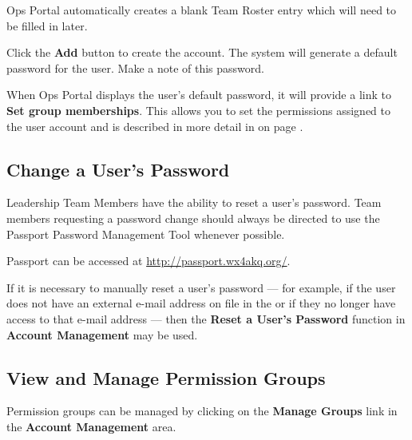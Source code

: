 \documentclass[pdflatex,letterpaper,twoside,12pt]{book}
\begin{document}

Ops Portal automatically creates a blank Team Roster entry which will need to be filled in later.

Click the \textbf{Add} button to create the account.  The system will generate a default password for the user.  Make a note of this password.

When Ops Portal displays the user's default password, it will provide a link to \textbf{Set group memberships}.  This allows you to set the permissions assigned to the user account and is described in more detail in  on page \pageref{ops-manage-groups}.

\subsection{Change a User's Password}\label{ops-change-user-password}

Leadership Team Members have the ability to reset a user's password.  Team members requesting a password change should always be directed to use the Passport Password Management Tool whenever possible.

Passport can be accessed at \url{http://passport.wx4akq.org/}.

If it is necessary to manually reset a user's password --- for example, if the user does not have an external e-mail address on file in the  or if they no longer have access to that e-mail address --- then the \textbf{Reset a User's Password} function in \textbf{Account Management} may be used.


\subsection{View and Manage Permission Groups}\label{ops-manage-groups}

Permission groups can be managed by clicking on the \textbf{Manage Groups} link in the \textbf{Account Management} area.
\end{document}

